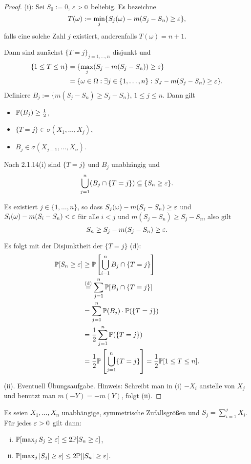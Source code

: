 \begin{proof}
  (i): Sei $S_0 := 0$, $\varepsilon > 0$ beliebig. Es bezeichne
  \[ T(\omega) := \min_j \{ S_j(\omega) - m(S_j - S_n) \ge \varepsilon \}, \]
  falls eine solche Zahl $j$ existiert, anderenfalls $T(\omega) = n + 1$.

  Dann sind zunächst $\{ T = j \}_{j=1, \ldots, n}$ disjunkt und
  \begin{align*}
    \{1 \le T \le n\}
    &= \{ \max_j (S_j - m(S_j - S_n)) \ge \varepsilon \} \\
    &= \{ \omega \in \Omega : \exists j \in \{1, \ldots, n\} : S_J - m(S_j - S_n) \ge \varepsilon  \}.
  \end{align*}
  Definiere $B_j := \{ m(S_j - S_n) \ge S_j - S_n\}$, $1 \le j \le n$. Dann gilt
  \begin{itemize}
  \item $\mathbb{P}(B_j) \ge \frac{1}{2}$,
  \item $\{ T = j \} \in \sigma(X_1, \ldots, X_j)$,
  \item $B_j \in \sigma(X_{j+1}, \ldots, X_n)$.
  \end{itemize}
  Nach 2.1.14(i) sind $\{T=j\}$ und $B_j$ unabhängig und
  \[ \bigcup_{j=1}^n (B_j \cap \{T=j\}) \subseteq \{S_n \ge \varepsilon\}. \]
  
  Es existiert $j \in \{1, \ldots, n\}$, so dass $S_j(\omega) - m(S_j - S_n) \ge
  \varepsilon$ und $S_i(\omega) - m(S_i - S_n) < \varepsilon$ für alle $i < j$ und $m(S_j -
  S_n) \ge S_j - S_n$, also gilt
  \[ S_n \ge S_j - m(S_j - S_n) \ge \varepsilon. \]

  Es folgt mit der Disjunktheit der $\{T=j\}$ (d):
  \begin{align*}
    \mathbb{P}[S_n \ge \varepsilon]
    &\ge \mathbb{P}\left[ \bigcup_{i=1}^n B_j \cap \{T=j\} \right] \\
    &\overset{\text{(d)}}{=}
      \sum_{j=1}^n \mathbb{P}[B_j \cap \{T=j\}] \\
    &= \sum_{j=1}^n \mathbb{P}(B_j) \cdot \mathbb{P}(\{T=j\}) \\
    &= \frac{1}{2} \sum_{j=1}^n \mathbb{P}(\{T=j\})\\
    &= \frac{1}{2} \mathbb{P} \left[ \bigcup_{j=1}^n \{T=j\} \right] = \frac{1}{2} \mathbb{P} [1 \le T \le n].
  \end{align*}

  (ii). Eventuell Übungsaufgabe. Hinweis: Schreibt man in (i) $-X_i$ anstelle
  von $X_j $ und benutzt man $m(-Y) = -m(Y)$, folgt (ii).
\end{proof}

\begin{folg}
  Es seien $X_1, \ldots, X_n$ unabhängige, symmetrische Zufallsgrößen und $S_j =
  \sum_{i=1}^j X_i$. Für jedes $\varepsilon > 0$ gilt dann:
  \begin{enumerate}[(i)]
  \item $\mathbb{P}[\max_j S_j \ge \varepsilon] \le 2 \mathbb{P}[S_n \ge \varepsilon]$,
  \item $\mathbb{P}[\max_j |S_j| \ge \varepsilon] \le 2 \mathbb{P}[|S_n| \ge \varepsilon]$.
  \end{enumerate}
\end{folg}


